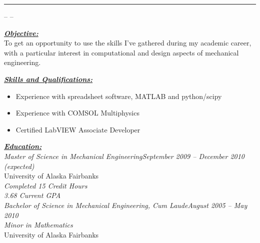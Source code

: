 \documentclass[10pt, letterpaper]{article}
\author{Joshua Holbrook}
\renewcommand{\section}[1]{\bigskip\Large\textbf{\underline{\textit{#1}}}\normalsize\\} %
\begin{document}
\textbf{\Huge \theauthor }\hrule
\smallskip\small \theaddress -- \phonenumber -- \emailaddress \normalsize

\section{Objective:}

\small To get an opportunity to use the skills I've gathered during my academic career,
with a particular interest in computational and design aspects of mechanical
engineering.\normalsize


\section{Skills and Qualifications:}
\small\begin{itemize}
\item Experience with spreadsheet software, MATLAB and python/scipy
\item Experience with COMSOL Multiphysics
\item Certified LabVIEW Associate Developer
\end{itemize}\normalsize

\section{Education:}

\large\textit{Master of Science in Mechanical Engineering\hfill September 2009 -- December 2010 (expected)}\normalsize \\
University of Alaska Fairbanks\\
\emph{Completed 15 Credit Hours}\\
\emph{3.68 Current GPA}\\

\large\textit{Bachelor of Science in Mechanical Engineering, Cum Laude\hfill August 2005 -- May 2010}\normalsize \\
\textit{Minor in Mathematics}\\
University of Alaska Fairbanks\\
\end{document}
